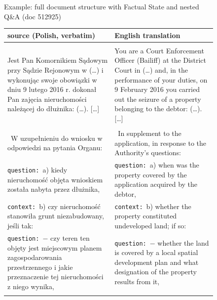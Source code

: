 \begin{figure}[!htb]
\begin{examplebox}{Example: full document structure with Factual State and nested Q\&A (doc 512925)}
\footnotesize
\begin{tabularx}{\linewidth}{@{}>{\raggedright\arraybackslash}X@{\hspace{1em}}>{\raggedright\arraybackslash}X@{}}
\toprule
\textbf{source (Polish, verbatim)} & \textbf{English translation} \\
\midrule

\multicolumn{2}{@{}l}{\textbf{Factual State (\textit{Stan faktyczny})}} \\
\midrule
Jest Pan Komornikiem Sądowym przy Sądzie Rejonowym w (\dots) i wykonując swoje obowiązki w dniu 9 lutego 2016 r. dokonał Pan zajęcia nieruchomości należącej do dłużnika: (\dots). [\dots]
&
You are a Court Enforcement Officer (Bailiff) at the District Court in (\dots) and, in the performance of your duties, on 9 February 2016 you carried out the seizure of a property belonging to the debtor: (\dots). [\dots] \\
\addlinespace

\midrule
\multicolumn{2}{@{}l}{\textbf{Supplementary Section (\textit{Uzupełnienie})}} \\
\midrule
~W uzupełnieniu do wniosku w odpowiedzi na pytania Organu:
&
~In supplement to the application, in response to the Authority's questions: \\
\addlinespace

\texttt{question:}~a) kiedy nieruchomość objęta wnioskiem została nabyta przez dłużnika, &
\texttt{question:}~a) when was the property covered by the application acquired by the debtor, \\
\addlinespace

\texttt{context:}~b) czy nieruchomość stanowiła grunt niezabudowany, jeśli tak: &
\texttt{context:}~b) whether the property constituted undeveloped land; if so: \\
\addlinespace

\hspace{1em} \texttt{question:}~$-$ czy teren ten objęty jest miejscowym planem zagospodarowania przestrzennego i jakie przeznaczenie tej nieruchomości z niego wynika, &
\hspace{1em} \texttt{question:}~$-$ whether the land is covered by a local spatial development plan and what designation of the property results from it, \\
\addlinespace


\end{tabularx}
\end{examplebox}
\end{figure}
